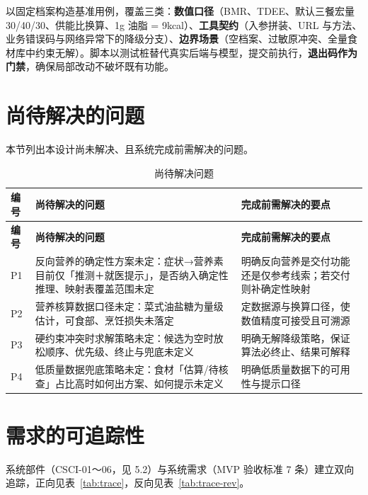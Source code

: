 \documentclass[12pt,a4paper]{ctexart}
\begin{document}
以固定档案构造基准用例，覆盖三类：\textbf{数值口径}（BMR、TDEE、默认三餐宏量 30/40/30、供能比换算、1g 油脂 = 9kcal）、\textbf{工具契约}（入参拼装、URL 与方法、业务错误码与网络异常下的降级分支）、\textbf{边界场景}（空档案、过敏原冲突、全量食材库中约束无解）。脚本以测试桩替代真实后端与模型，提交前执行，\textbf{退出码作为门禁}，确保局部改动不破坏既有功能。

\section{尚待解决的问题}

本节列出本设计尚未解决、且系统完成前需解决的问题。

\begin{xltabular}{\linewidth}{p{0.9cm}Q{8.2cm}L}
\caption{尚待解决问题\label{tab:open}} \\
\toprule
\textbf{编号} & \textbf{尚待解决的问题} & \textbf{完成前需解决的要点} \\
\midrule
\endfirsthead
\toprule
\textbf{编号} & \textbf{尚待解决的问题} & \textbf{完成前需解决的要点} \\
\midrule
\endhead
P1 & 反向营养的确定性方案未定：症状→营养素目前仅「推测＋就医提示」，是否纳入确定性推理、映射表覆盖范围未定 & 明确反向营养是交付功能还是仅参考线索；若交付则补确定性映射 \\
P2 & 营养核算数据口径未定：菜式油盐糖为量级估计，可食部、烹饪损失未落定 & 定数据源与换算口径，使数值精度可接受且可溯源 \\
P3 & 硬约束冲突时求解策略未定：候选为空时放松顺序、优先级、终止与兜底未定义 & 明确无解降级策略，保证算法必终止、结果可解释 \\
P4 & 低质量数据兜底策略未定：食材「估算/待核查」占比高时如何出方案、如何提示未定义 & 明确低质量数据下的可用性与提示口径 \\
\bottomrule
\end{xltabular}

\section{需求的可追踪性}

系统部件（CSCI-01～06，见 5.2）与系统需求（MVP 验收标准 7 条）建立双向追踪，正向见表~\ref{tab:trace}，反向见表~\ref{tab:trace-rev}。
\end{document}

